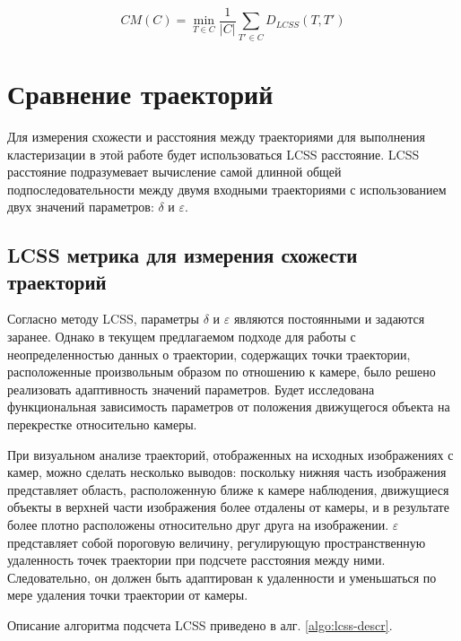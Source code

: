 \begin{equation} \label{eq:cm_traj}
	CM(C) = \min\limits_{T \in C} \frac{1}{|C|} \sum_{T' \in C} D_{LCSS}(T, T')
\end{equation}

\section{Сравнение траекторий}

Для измерения схожести и расстояния между траекториями для выполнения кластеризации в этой работе будет использоваться LCSS расстояние. LCSS расстояние подразумевает вычисление самой длинной общей подпоследовательности между двумя входными траекториями с использованием двух значений параметров: $\delta$ и $\varepsilon$.

\subsection{LCSS метрика для измерения схожести траекторий}

Согласно методу LCSS, параметры $\delta$ и $\varepsilon$ являются постоянными и задаются заранее. Однако в текущем предлагаемом подходе для работы с неопределенностью данных о траектории, содержащих точки траектории, расположенные произвольным образом по отношению к камере, было решено реализовать адаптивность значений параметров. Будет исследована функциональная зависимость параметров от положения движущегося объекта на перекрестке относительно камеры.

При визуальном анализе траекторий, отображенных на исходных изображениях с камер, можно сделать несколько выводов: поскольку нижняя часть изображения представляет область, расположенную ближе к камере наблюдения, движущиеся объекты в верхней части изображения более отдалены от камеры, и в результате более плотно расположены относительно друг друга на изображении. $\varepsilon$ представляет собой пороговую величину, регулирующую пространственную удаленность точек траектории при подсчете расстояния между ними. Следовательно, он должен быть адаптирован к удаленности и уменьшаться по мере удаления точки траектории от камеры.

Описание алгоритма подсчета LCSS приведено в алг. \ref{algo:lcss-descr}.

